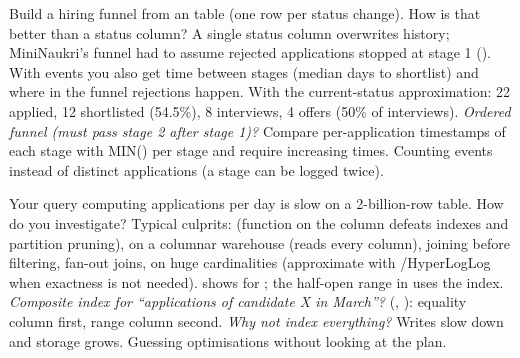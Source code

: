 \begin{qa}{Build a hiring funnel from an  table (one row per status change). How is that better than a status column?}
\why A single status column overwrites history; MiniNaukri's funnel had to assume rejected applications stopped at stage 1 (). With events
you also get time between stages (median days to shortlist) and where in the funnel rejections happen.
\worked With the current-status approximation: 22 applied, 12 shortlisted (54.5\%), 8 interviews, 4 offers (50\% of interviews).
\pushes \emph{Ordered funnel (must pass stage 2 after stage 1)?} Compare per-application timestamps of each stage with MIN() per stage and require
increasing times.
\pitfall Counting events instead of distinct applications (a stage can be logged twice).
\end{qa}

\begin{qa}{Your query computing applications per day is slow on a 2-billion-row table. How do you investigate?}
\why Typical culprits:  (function on the column defeats indexes and partition pruning),  on a columnar
warehouse (reads every column), joining before filtering, fan-out joins,  on huge cardinalities (approximate with
/HyperLogLog when exactness is not needed).
\worked {} shows  for ; the half-open range in 
uses the index.
\pushes \emph{Composite index for ``applications of candidate X in March''?} (, ): equality column first, range
column second. \emph{Why not index everything?} Writes slow down and storage grows.
\pitfall Guessing optimisations without looking at the plan.
\end{qa}

